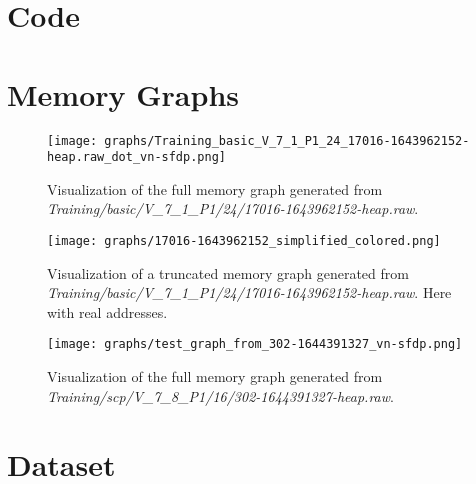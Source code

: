 \section{Code}

\section{Memory Graphs}

\begin{figure}[H]\label{appendix:mem_graph:17016-1643962152:full}
    \centering
    \texttt{[image: graphs/Training\_basic\_V\_7\_1\_P1\_24\_17016-1643962152-heap.raw\_dot\_vn-sfdp.png]}
    \caption{Visualization of the full memory graph generated from \textit{Training/basic/V\_7\_1\_P1/24/17016-1643962152-heap.raw}.}
\end{figure}

\begin{figure}[H]\label{appendix:mem_graph:17016-1643962152:truncated}
    \centering
    \texttt{[image: graphs/17016-1643962152\_simplified\_colored.png]}
    \caption{Visualization of a truncated memory graph generated from \textit{Training/basic/V\_7\_1\_P1/24/17016-1643962152-heap.raw}. Here with real addresses.}
\end{figure}

\begin{figure}[H]\label{appendix:mem_graph:302-1644391327:full}
    \centering
    \texttt{[image: graphs/test\_graph\_from\_302-1644391327\_vn-sfdp.png]}
    \caption{Visualization of the full memory graph generated from \textit{Training/scp/V\_7\_8\_P1/16/302-1644391327-heap.raw}.}
\end{figure}

\section{Dataset}
